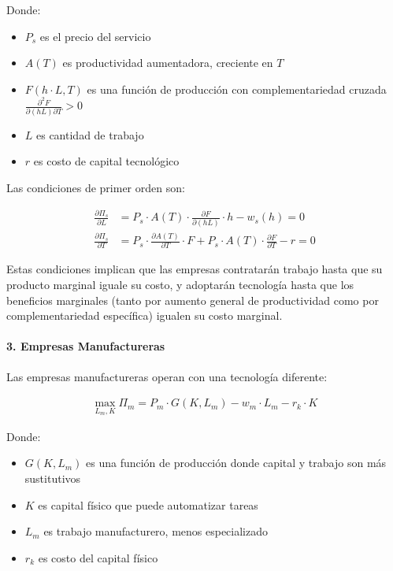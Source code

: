 \documentclass{article}
\theoremstyle{remark}
\theoremstyle{definition}
\begin{document}
\begin{tcolorbox}
Donde:
\begin{itemize}
\item $P_s$ es el precio del servicio
\item $A(T)$ es productividad aumentadora, creciente en $T$
\item $F(h \cdot L, T)$ es una función de producción con complementariedad cruzada $\frac{\partial^2 F}{\partial (hL) \partial T} > 0$
\item $L$ es cantidad de trabajo
\item $r$ es costo de capital tecnológico
\end{itemize}

Las condiciones de primer orden son:

\begin{align}
\frac{\partial \Pi_s}{\partial L} &= P_s \cdot A(T) \cdot \frac{\partial F}{\partial (hL)} \cdot h - w_s(h) = 0\\
\frac{\partial \Pi_s}{\partial T} &= P_s \cdot \frac{\partial A(T)}{\partial T} \cdot F + P_s \cdot A(T) \cdot \frac{\partial F}{\partial T} - r = 0
\end{align}

Estas condiciones implican que las empresas contratarán trabajo hasta que su producto marginal iguale su costo, y adoptarán tecnología hasta que los beneficios marginales (tanto por aumento general de productividad como por complementariedad específica) igualen su costo marginal.

\paragraph{3. Empresas Manufactureras}
Las empresas manufactureras operan con una tecnología diferente:

\begin{align}
\max_{L_m,K} \Pi_m = P_m \cdot G(K, L_m) - w_m \cdot L_m - r_k \cdot K
\end{align}

Donde:
\begin{itemize}
\item $G(K, L_m)$ es una función de producción donde capital y trabajo son más sustitutivos
\item $K$ es capital físico que puede automatizar tareas
\item $L_m$ es trabajo manufacturero, menos especializado
\item $r_k$ es costo del capital físico
\end{itemize}


\end{tcolorbox}
\end{document}
